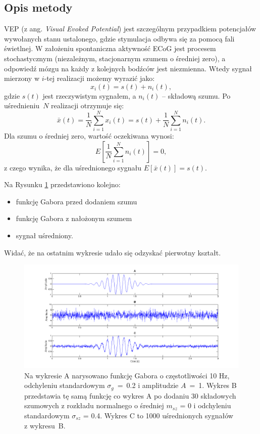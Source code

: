 \documentclass{pracamgr_2}
\begin{document}
	\subsection{Opis metody}
	VEP (z ang. \textit{Visual Evoked Potential}) jest szczególnym przypadkiem potencjałów wywołanych stanu ustalonego, gdzie stymulacja odbywa się za pomocą fali świetlnej. W założeniu spontaniczna aktywność ECoG jest procesem stochastycznym (niezależnym, stacjonarnym szumem o średniej zero), a odpowiedź mózgu na każdy z kolejnych bodźców jest niezmienna. Wtedy sygnał mierzony w $i$-tej realizacji możemy wyrazić jako:
	\begin{equation}
		x_i(t) = s(t) + n_i(t),
	\end{equation}
	gdzie $s(t)$ jest rzeczywistym sygnałem, a $n_i(t)$ -- składową szumu. Po uśrednieniu~$N$ realizacji otrzymuje się:
	\begin{equation}
		\bar{x}(t) = \frac{1}{N} \sum_{i=1}^{N} x_i(t) = s(t) + \frac{1}{N}\sum_{i=1}^{N} n_i(t).
	\end{equation}
	Dla szumu o średniej zero, wartość oczekiwana wynosi:
	\begin{equation}
		E\left[ \frac{1}{N}\sum_{i=1}^{N} n_i(t)\right] = 0, 
	\end{equation}
	z czego wynika, że dla uśrednionego sygnału $E\left[ \bar{x}(t) \right] = s(t).$
	
	Na Rysunku \ref{rys:gabor} przedstawiono kolejno:
	\begin{itemize}
		\item funkcję Gabora przed dodaniem szumu
		\item funkcję Gabora z nałożonym szumem
		\item sygnał uśredniony.
	\end{itemize}
	Widać, że na ostatnim wykresie udało się odzyskać pierwotny kształt.
	\begin{figure}[h]
		\begin{center}
			\includegraphics[scale = 0.7]{gabor.png}
		\end{center}
		\caption{Na wykresie A narysowano funkcję Gabora o częstotliwości 10 Hz, odchyleniu standardowym $\sigma_g$~=~0.2 i amplitudzie $A$~=~1. Wykres B przedstawia tę samą funkcję co wykres A po dodaniu 30 składowych szumowych z rozkładu normalnego o średniej $m_{sz}$ = 0 i odchyleniu standardowym $\sigma_{sz}$ = 0.4. Wykres C to 1000 uśrednionych sygnałów z wykresu~B.}
		\label{rys:gabor}
	\end{figure}
\end{document}
